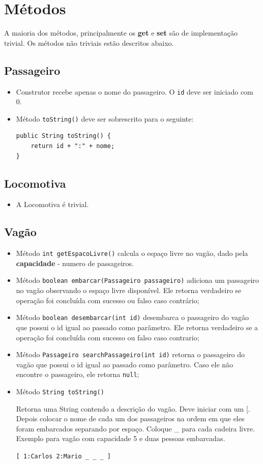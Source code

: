 \documentclass[12pt]{article}
\renewcommand{\tt}[1]{\lstinline|#1|}
\renewcommand{\bf}[1]{\textbf{#1}}
\begin{document}
\section{Métodos}
A maioria dos métodos, principalmente os \bf{get} e \bf{set} são de implementação trivial. Os métodos não
triviais estão descritos abaixo.

\subsection{Passageiro}
	\begin{itemize}
		\item Construtor recebe apenas o nome do passageiro. O \tt{id} deve ser iniciado com 0.
		\item Método \tt{toString()} deve ser sobrescrito para o seguinte:
		\begin{lstlisting}
public String toString() {
    return id + ":" + nome;
}
		\end{lstlisting} 
	\end{itemize}

\subsection{Locomotiva}
	\begin{itemize}
	\item A Locomotiva é trivial.
	\end{itemize}
	
\subsection{Vagão}
\begin{itemize}
\item Método \tt{int getEspacoLivre()} calcula o espaço livre no vagão, dado pela \bf{capacidade} - numero de passageiros.

\item Método \tt{boolean embarcar(Passageiro passageiro)}  adiciona um passageiro no vagão observando o espaço livre disponível. Ele retorna verdadeiro se operação foi concluída com sucesso ou falso caso contrário;
\item Método \tt{boolean desembarcar(int id)} desembarca o passageiro do vagão que possui o id igual ao passado como parâmetro. Ele retorna verdadeiro se a operação foi concluída com sucesso ou falso caso contrario;
\item Método \tt{Passageiro searchPassageiro(int id)} retorna o passageiro do vagão que possui o id igual ao passado como parâmetro. Caso ele não encontre o passageiro, ele retorna \tt{null};
\item Método \tt{String toString()}

Retorna uma String contendo a descrição do vagão. Deve iniciar com um [.
Depois colocar o nome de cada um dos passageiros na ordem em que eles foram embarcados separando por espaço. Coloque \_ para cada cadeira livre.
Exemplo para vagão com capacidade 5 e duas pessoas embarcadas.

\verb|[ 1:Carlos 2:Mario _ _ _ ]|

\end{itemize}
\end{document}
